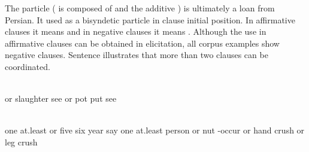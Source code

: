 The particle  ( is composed of  and the additive ) is ultimately a loan from Persian. It used as a bisyndetic particle in clause initial position. In affirmative clauses it means  and in negative clauses it means . Although the use in affirmative clauses can be obtained in elicitation, all corpus examples show negative clauses. Sentence  illustrates that more than two clauses can be coordinated.
%
\begin{exe}
	\ex	\label{ex:‎‎‎I did not see neither how they slaughtered (the sheep) nor did I see how they put the pot on the fire (in order to cook it)}
	\gll	[ja	luχ-unne	či-a-b-až-ib=da]	[ja	ħaˁšak	či-ha-b-irxː-ul	či-a-b-až-ib=da]\\
		or	slaughter	see	or	pot	put	see\\
	\glt	{}

	\ex	\label{ex:‎‎‎Since at least five or six years, he says, no man did fell down from the nut (tree) nor broke the hand or broke a leg}
	\\
		one	at.least	or	five	six	year	say		one	at.least	person	or	nut	-occur\tsc{.pfv-pret}	or	hand	\tsc{neg-n-}crush	or	leg	crush\\
	\glt	{}
\end{exe}

